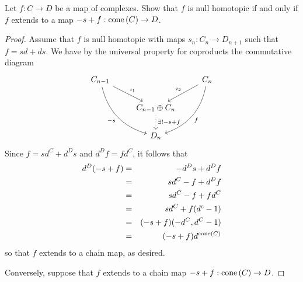 \documentclass[10pt]{amsart}
\begin{document}
\begin{thm}
	Let $f : C \rightarrow D$ be a map of complexes.
	Show that $f$ is null homotopic if and only if $f$ extends to a map $-s + f : \operatorname{cone}\left(C\right) \rightarrow D$.
	
	\begin{proof}
		Assume that $f$ is null homotopic with maps $s_n : C_n \rightarrow D_{n+1}$ such that $f = sd + ds$.
		We have by the universal property for coproducts the commutative diagram
		$$\begin{tikzcd}
			C_{n-1}\arrow[bend right, swap]{rdd}{-s} \arrow{rd}{\imath_1} & & C_n \arrow[swap]{ld}{\imath_2} \arrow[bend left]{ldd}{f}\\
			& C_{n-1} \oplus C_n \arrow[dotted]{d}{\exists ! -s + f}& \\
			& D_n &
		\end{tikzcd}$$
		Since $f = sd^C + d^Ds$ and $d^Df = fd^C$, it follows that 
		\begin{eqnarray*}
			d^D(-s + f) &=& -d^Ds + d^Df\\
			&=& sd^C - f + d^Df\\
			&=& sd^C - f + fd^C\\
			&=& sd^C + f(d^c - 1)\\
			&=& (-s + f)(-d^C, d^C - 1)\\
			&=& (-s + f)d^{\operatorname{cone}\left(C\right)}
		\end{eqnarray*}
		so that $f$ extends to a chain map, as desired.

		Conversely, suppose that $f$ extends to a chain map $-s + f : \operatorname{cone}\left(C\right) \rightarrow D$.
		
	\end{proof}
\end{thm}
\end{document}
